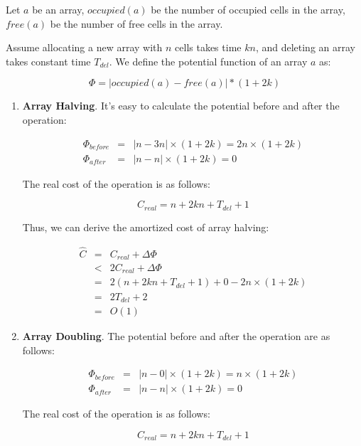 Let $a$ be an array, $occupied(a)$ be the number of occupied cells in the array, $free(a)$ be the number of free cells in the array.

Assume allocating a new array with $n$ cells takes time $kn$, and deleting an array takes constant time $T_{del}$. We define the potential function of an array $a$ as:

\begin{equation}
\Phi = | occupied(a) - free(a) | * (1 + 2k)
\end{equation}

\begin{enumerate}

\item \textbf{Array Halving}. It's easy to calculate the potential before and after the operation:

\[
\begin{array}{lcl}
  \Phi_{before} & = & | n - 3n | \times (1 + 2k) = 2n \times (1 + 2k) \\
  \Phi_{after} & = & | n - n | \times (1 + 2k) = 0
\end{array}
\]

The real cost of the operation is as follows:

\[
C_{real} = n + 2kn + T_{del} + 1
\]

Thus, we can derive the amortized cost of array halving:

\[
\begin{array}{lcl}
\hat C & = & C_{real} + \Delta \Phi \\
       & < & 2 C_{real} + \Delta \Phi \\
       & = & 2(n + 2kn + T_{del} + 1) + 0 - 2n \times (1 + 2k) \\
       & = & 2T_{del} + 2 \\
       & = & O(1)
\end{array}
\]

\item \textbf{Array Doubling}. The potential before and after the operation are as follows:

\[
\begin{array}{lcl}
  \Phi_{before} & = & | n - 0 | \times (1 + 2k) = n \times (1 + 2k) \\
  \Phi_{after} & = & | n - n | \times (1 + 2k) = 0
\end{array}
\]

The real cost of the operation is as follows:

\[
C_{real} = n + 2kn + T_{del} + 1
\]


\end{enumerate}
